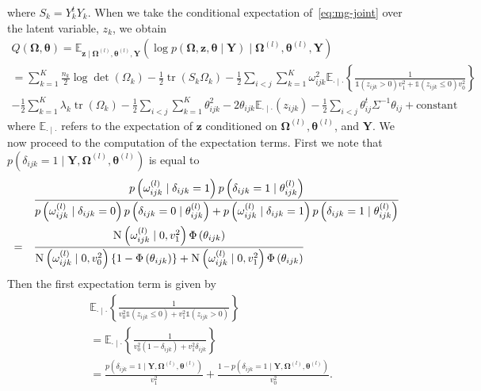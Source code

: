 \documentclass[a4paper, 11pt, oneside]{report}
\DeclareMathOperator{\tr}{tr}
\newcommand{\E}{\mathbb{E}}
\newcommand{\1}{\mathds{1}}
\newcommand{\powl}{^{(l)}}
\newcommand{\inv}{^{-1}}
\newcommand{\Nor}{\textsc{N}}
\newcommand{\bOmega}{\mathbf{\Omega}}
\newcommand{\bz}{\mathbf{z}}
\newcommand{\btheta}{\mathbf{\theta}}
\newcommand{\bY}{\mathbf{Y}}
\begin{document}
where $S_k = Y_k^t Y_k$.
When we take the conditional expectation of~\eqref{eq:mg-joint} over the latent
variable, $z_k$, we obtain
\begin{multline}\label{eq:mg-exp}
	Q(\mathbf{\Omega}, \mathbf{\theta}) =  \E_{\mathbf{z} \mid
	\mathbf{\Omega}\powl, \mathbf{\theta}\powl, \mathbf{Y}}(\log
	p(\mathbf{\Omega},  \mathbf{z}, \mathbf{\theta} \mid \mathbf{Y}) \mid
	\mathbf{\Omega}\powl, \mathbf{\theta}\powl, \mathbf{Y})                    \\
	= \sum_{k=1}^K \frac{n_k}{2} \log \det(\Omega_k) - \frac{1}{2} \tr(S_k \Omega_k) - \frac{1}{2} \sum_{i < j} \sum_{k=1}^K \omega_{ijk}^2 \E_{\cdot \mid \cdot} \left\{\frac{1}{\1(z_{ijk} > 0) v_1^2 + \1(z_{ijk} \leq 0) v_0^2}\right\} \\
	- \frac{1}{2} \sum_{k=1}^K \lambda_k \tr(\Omega_k)  -\frac{1}{2} \sum_{i < j} \sum_{k = 1}^K \theta_{ijk}^2 - 2 \theta_{ijk} \E_{\cdot \mid \cdot}(z_{ijk}) - \frac{1}{2} \sum_{i < j} \theta_{ij}^t \Sigma\inv \theta_{ij} + \text{constant}
\end{multline}
where $\E_{\cdot \mid \cdot}$ refers to the expectation of $\bz$ conditioned on
$\bOmega\powl, \btheta\powl$, and $\bY$.
We now proceed to the computation of the expectation terms.
First we note that $p(\delta_{ijk} = 1 \mid \bY, \bOmega\powl, \btheta\powl)$
is equal to
\begin{align*}
	       & \frac{p\left(\omega_{ijk}\powl \mid \delta_{ijk}=1\right) p\left(\delta_{ijk}=1 \mid
		\theta_{ijk}\powl\right)}{p\left(\omega_{ijk}\powl \mid \delta_{ijk}=0\right) p\left(\delta_{ijk}=0 \mid
		\theta_{ijk}\powl\right) + p\left(\omega_{ijk}\powl \mid \delta_{ijk}=1\right) p\left(\delta_{ijk}=1 \mid
	\theta_{ijk}\powl\right)}                                                                     \\
	=\quad & \frac{\Nor\left(\omega_{ijk}\powl \mid 0,
		v_1^2\right)\Phi\left(\theta_{ijk}\right)}{\Nor\left(\omega_{ijk}\powl \mid 0,
		v_0^2\right)\{1 -
		\Phi\left(\theta_{ijk}\right)\} +
		\Nor\left(\omega_{ijk}\powl \mid 0, v_1^2\right)
		\Phi\left(\theta_{ijk}\right)}
\end{align*}
Then the first expectation term is given by
\begin{align*}
	 & \E_{\cdot \mid \cdot} \left\{ \frac{1}{v_0^2 \1(z_{ijk} \leq 0) + v_1^2 \1(z_{ijk} > 0)} \right\} \\
	 & = \E_{\cdot \mid \cdot} \left\{ \frac{1}{v_0^2 ( 1 - \delta_{ijk}) + v_1^2 \delta_{ijk}} \right\} \\
	 & = \frac{p(\delta_{ijk} = 1 \mid \bY, \bOmega\powl, \btheta\powl)}{v_1^2}
	+ \frac{1 - p(\delta_{ijk} = 1 \mid \bY, \bOmega\powl,
		\btheta\powl)}{v_0^2}.
\end{align*}
\end{document}
